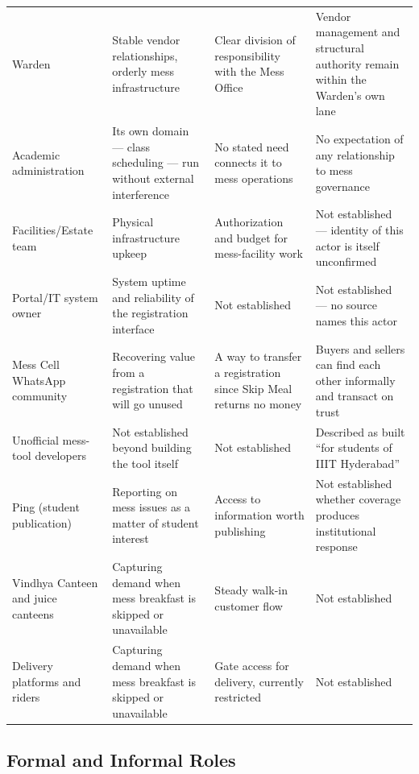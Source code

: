 \documentclass[11pt]{article}
\begin{document}
{\begin{longtable}{L{0.19\textwidth}L{0.23\textwidth}L{0.23\textwidth}L{0.21\textwidth}}
Warden & Stable vendor relationships, orderly mess infrastructure & Clear division of
responsibility with the Mess Office & Vendor management and structural authority
remain within the Warden's own lane \\[4pt]

Academic administration & Its own domain --- class scheduling --- run without
external interference & No stated need connects it to mess operations & No
expectation of any relationship to mess governance \\[4pt]

Facilities/Estate team & Physical infrastructure upkeep & Authorization and budget
for mess-facility work & Not established --- identity of this actor is itself
unconfirmed \\[4pt]

Portal/IT system owner & System uptime and reliability of the registration interface
& Not established & Not established --- no source names this actor \\[4pt]

Mess Cell WhatsApp community & Recovering value from a registration that will go
unused & A way to transfer a registration since Skip Meal returns no money & Buyers
and sellers can find each other informally and transact on trust \\[4pt]

Unofficial mess-tool developers & Not established beyond building the tool itself &
Not established & Described as built ``for students of IIIT Hyderabad'' \\[4pt]

Ping (student publication) & Reporting on mess issues as a matter of student interest
& Access to information worth publishing & Not established whether coverage produces
institutional response \\[4pt]

Vindhya Canteen and juice canteens & Capturing demand when mess breakfast is skipped
or unavailable & Steady walk-in customer flow & Not established \\[4pt]

Delivery platforms and riders & Capturing demand when mess breakfast is skipped or
unavailable & Gate access for delivery, currently restricted & Not established \\
\bottomrule
\end{longtable}}

\subsection{Formal and Informal Roles}
\end{document}
